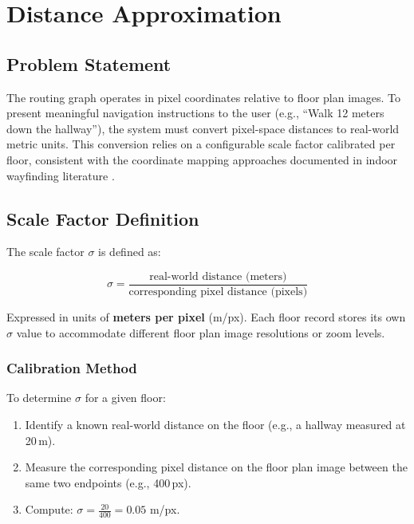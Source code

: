 \section{Distance Approximation}
\label{sec:distance-approximation}

\subsection{Problem Statement}

The routing graph operates in pixel coordinates relative to floor plan images. To present meaningful navigation instructions to the user (e.g., ``Walk 12 meters down the hallway''), the system must convert pixel-space distances to real-world metric units. This conversion relies on a configurable scale factor calibrated per floor, consistent with the coordinate mapping approaches documented in indoor wayfinding literature \cite{Makri2015, Park2020}.

\subsection{Scale Factor Definition}

The scale factor $\sigma$ is defined as:

\begin{equation}
\sigma = \frac{\text{real-world distance (meters)}}{\text{corresponding pixel distance (pixels)}}
\end{equation}

Expressed in units of \textbf{meters per pixel} (m/px). Each floor record stores its own $\sigma$ value to accommodate different floor plan image resolutions or zoom levels.

\subsubsection{Calibration Method}

To determine $\sigma$ for a given floor:

\begin{enumerate}
  \item Identify a known real-world distance on the floor (e.g., a hallway measured at 20\,m).
  \item Measure the corresponding pixel distance on the floor plan image between the same two endpoints (e.g., 400\,px).
  \item Compute: $\sigma = \frac{20}{400} = 0.05$ m/px.
\end{enumerate}


